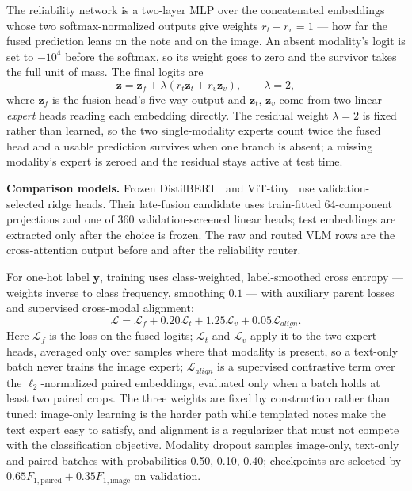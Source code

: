 \documentclass[conference]{IEEEtran}
\begin{document}
The reliability network is a two-layer MLP over the concatenated embeddings
whose two softmax-normalized outputs give weights $r_t+r_v=1$ --- how far the
fused prediction leans on the note and on the image. An absent modality's logit
is set to $-10^{4}$ before the softmax, so its weight goes to zero and the
survivor takes the full unit of mass. The final logits are
\begin{equation}
\mathbf{z}=\mathbf{z}_f+\lambda\left(r_t\mathbf{z}_t+r_v\mathbf{z}_v\right),\qquad\lambda=2,
\label{eq:logits}
\end{equation}
where $\mathbf{z}_f$ is the fusion head's five-way output and $\mathbf{z}_t$,
$\mathbf{z}_v$ come from two linear \emph{expert} heads reading each embedding
directly. The residual weight $\lambda=2$ is
fixed rather than learned, so the two single-modality experts count twice the
fused head and a usable prediction survives when one branch is absent; a
missing modality's expert is zeroed and the residual stays active at test time.

\textbf{Comparison models.} Frozen DistilBERT~\cite{Sanh2019} and
ViT-tiny~\cite{Dosovitskiy2021} use validation-selected ridge heads. Their
late-fusion candidate uses train-fitted 64-component projections and one of 360
validation-screened linear heads; test embeddings are extracted only after the
choice is frozen. The raw and routed VLM rows are the cross-attention output
before and after the reliability router.

For one-hot label $\mathbf{y}$, training uses class-weighted, label-smoothed
cross entropy --- weights inverse to class frequency, smoothing $0.1$ --- with
auxiliary parent losses and supervised cross-modal alignment:
\begin{equation}
\mathcal{L}=\mathcal{L}_{f}
 +0.20\mathcal{L}_{t}
 +1.25\mathcal{L}_{v}
 +0.05\mathcal{L}_{align}.
\label{eq:loss}
\end{equation}
Here $\mathcal{L}_{f}$ is the loss on the fused logits; $\mathcal{L}_{t}$ and
$\mathcal{L}_{v}$ apply it to the two expert heads, averaged only over samples
where that modality is present, so a text-only batch never trains the image
expert; $\mathcal{L}_{align}$ is a supervised contrastive term over the
$\ell_2$-normalized paired embeddings, evaluated only when a batch holds at
least two paired crops. The
three weights are fixed by construction rather than tuned: image-only learning
is the harder path while templated notes make the text expert easy to satisfy,
and alignment is a regularizer that must not compete with the classification
objective. Modality dropout samples image-only, text-only and paired batches with
probabilities 0.50, 0.10, 0.40; checkpoints are selected by
$0.65F_{1,\mathrm{paired}}+0.35F_{1,\mathrm{image}}$ on validation.
\end{document}
